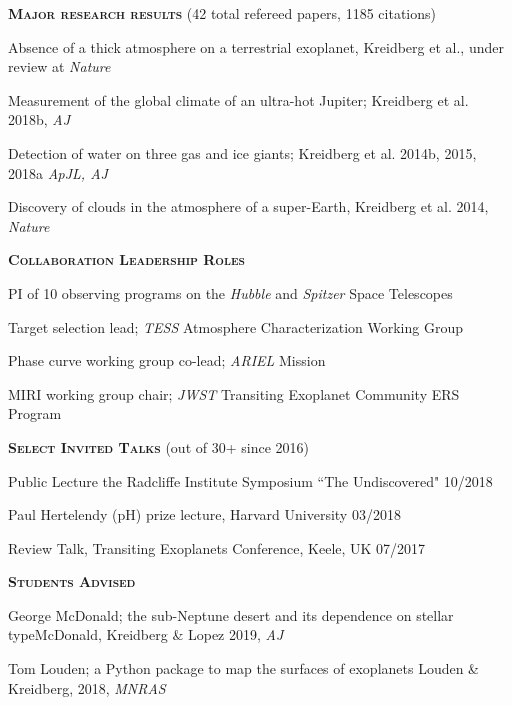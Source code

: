 \documentclass[12pt,letterpaper]{article}
\newcommand\tab[1][1cm]{\hspace*{#1}}
\begin{document}
\textbf{\textsc{Major research results}} (42 total refereed papers, 1185 citations) 
\begin{compactitem}[]

\item Absence of a thick atmosphere on a terrestrial exoplanet, Kreidberg et al., under review at \textit{Nature}

\item Measurement of the global climate of an ultra-hot Jupiter; Kreidberg et al. 2018b, \textit{AJ}

\item Detection of water on three gas and ice giants; Kreidberg et al. 2014b, 2015, 2018a \textit{ApJL, AJ}

\item Discovery of clouds in the atmosphere of a super-Earth, 
Kreidberg et al. 2014, \textit{Nature}
\end{compactitem}
\vspace{5mm}

\textbf{\textsc{Collaboration Leadership Roles}}
\begin{compactitem}[]
\item PI of 10 observing programs on the \emph{Hubble} and \emph{Spitzer} Space Telescopes
\item Target selection lead; \emph{TESS} Atmosphere Characterization Working Group 
\item Phase curve working group co-lead; \emph{ARIEL} Mission 
\item MIRI working group chair; \emph{JWST} Transiting Exoplanet Community ERS Program
\end{compactitem}

\vspace{6mm}
\textbf{\textsc{Select Invited Talks}} (out of 30+ since 2016)
\begin{compactitem}[]
\item {Public Lecture the Radcliffe Institute Symposium ``The Undiscovered" \hfill 10/2018}
\item{Paul Hertelendy (pH) prize lecture, Harvard University \hfill 03/2018}
\item {Review Talk, Transiting Exoplanets Conference, Keele, UK \hfill 07/2017}
\end{compactitem}

\vspace{6mm}
\textbf{\textsc{Students Advised}}
\begin{compactitem}[]
\item George McDonald; the sub-Neptune desert and its dependence on stellar type\newline \tab McDonald, Kreidberg \& Lopez 2019, \textit{AJ}
\item Tom Louden; a Python package to map the surfaces of exoplanets \newline \tab Louden \& Kreidberg, 2018, \textit{MNRAS} 
\end{compactitem}
\end{document}
